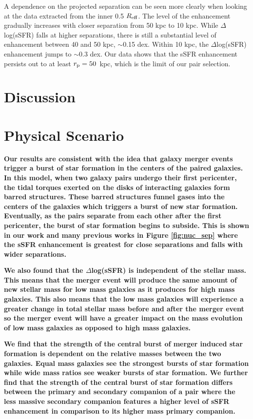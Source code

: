 \documentclass[iop,revtex4,twocolumn,apj,numberedappendix,appendixfloats]{emulateapj}
\newcommand{\reff}{$R_{\rm eff}$}
\begin{document}
A dependence on the projected separation can be seen more clearly when looking at the data extracted from the inner 0.5 \reff. The level of the enhancement gradually increases with closer separation from 50 kpc to 10 kpc. While $\Delta$log(sSFR) falls at higher separations, there is still a substantial level of enhancement between 40 and 50 kpc, $\sim$0.15 dex. Within 10 kpc, the $\Delta$log(sSFR) enhancement jumps to $\sim$0.3 dex. Our data shows that the sSFR enhancement persists out to at least $r_{\rm p} = 50$~kpc, which is the limit of our pair selection. 



\section{Discussion}\label{sec:disc}

\section{Physical Scenario}
\textbf{
Our results are consistent with the idea that galaxy merger events trigger a burst of star formation in the centers of the paired galaxies. In this model, when two galaxy pairs undergo their first pericenter, the tidal torques exerted on the disks of interacting galaxies form barred structures. These barred structures funnel gases into the centers of the galaxies which triggers a burst of new star formation. Eventually, as the pairs separate from each other after the first pericenter, the burst of star formation begins to subside. This is shown in our work and many previous works in Figure \ref{fig:nuc_sep} where the sSFR enhancement is greatest for close separations and falls with wider separations. 
}

\textbf{
We also found that the $\Delta$log(sSFR) is independent of the stellar mass. This means that the merger event will produce the same amount of new stellar mass for low mass galaxies as it produces for high mass galaxies. This also means that the low mass galaxies will experience a greater change in total stellar mass before and after the merger event so the merger event will have a greater impact on the mass evolution of low mass galaxies as opposed to high mass galaxies.
}

\textbf{
We find that the strength of the central burst of merger induced star formation is dependent on the relative masses between the two galaxies. Equal mass galaxies see the strongest bursts of star formation while wide mass ratios see weaker bursts of star formation. We further find that the strength of the central burst of star formation differs between the primary and secondary companion of a pair where the less massive secondary companion features a higher level of sSFR enhancement in comparison to its higher mass primary companion. 
}
\end{document}
